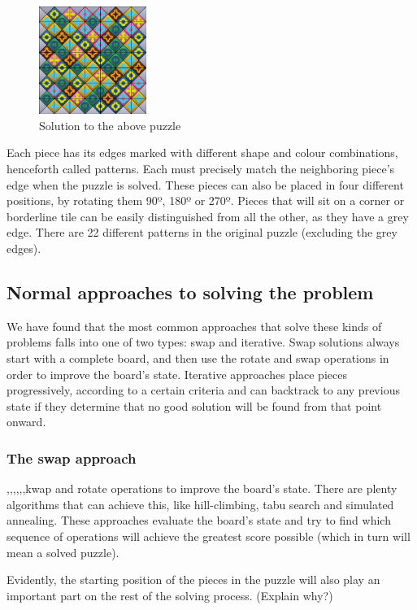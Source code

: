 \documentclass{llncs}
\begin{document}
\begin{figure}[h]
	\centering
	\includegraphics[width=35mm]{images/solved.png}
	\caption{Solution to the above puzzle}
	\label{fig:solved_example}
\end{figure}

Each piece has its edges marked with different shape and colour combinations, henceforth called patterns. Each must precisely match the neighboring piece's edge when the puzzle is solved. These pieces can also be placed in four different positions, by rotating them 90º, 180º or 270º. Pieces that will sit on a corner or borderline tile can be easily distinguished from all the other, as they have a grey edge. There are 22 different patterns in the original puzzle (excluding the grey edges).

\subsection{Normal approaches to solving the problem}\label{sec:normal_approaches}

We have found that the most common approaches that solve these kinds of problems falls into one of two types: swap and iterative. Swap solutions always start with a complete board, and then use the rotate and swap operations in order to improve the board's state. Iterative approaches place pieces progressively, according to a certain criteria and can backtrack to any previous state if they determine that no good solution will be found from that point onward.

\subsubsection{The swap approach}\label{sec:swap_approach}
,,,,,,kwap and rotate operations to improve the board's state. There are plenty algorithms that can achieve this, like hill-climbing, tabu search and simulated annealing. These approaches evaluate the board's state and try to find which sequence of operations will achieve the greatest score possible (which in turn will mean a solved puzzle).

Evidently, the starting position of the pieces in the puzzle will also play an important part on the rest of the solving process. (Explain why?)
\end{document}
